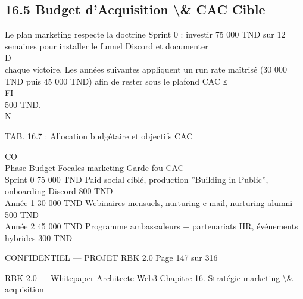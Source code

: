\subsection{16.5 Budget d’Acquisition \textbackslash{}& CAC Cible}
Le plan marketing respecte la doctrine Sprint 0 : investir 75 000 TND sur 12 semaines pour installer le funnel Discord et documenter\\
\vspace{0.5em}
\vspace{0.5em}
\vspace{0.5em}
\vspace{0.5em}
D\\
chaque victoire. Les années suivantes appliquent un run rate maîtrisé (30 000 TND puis 45 000 TND) afin de rester sous le plafond CAC ≤\\
\vspace{0.5em}
\vspace{0.5em}
\vspace{0.5em}
\vspace{0.5em}
FI\\
500 TND.\\
\vspace{0.5em}
N\\
\begin{center}\begin{tabular}TAB. 16.7 : Allocation budgétaire et objectifs CAC\end{tabular}\end{center}
CO\\
Phase Budget        Focales marketing                                                      Garde-fou CAC\\
Sprint 0 75 000 TND Paid social ciblé, production ”Building in Public”, onboarding Discord 800 TND\\
Année 1 30 000 TND Webinaires mensuels, nurturing e-mail, nurturing alumni                 500 TND\\
Année 2 45 000 TND Programme ambassadeurs + partenariats HR, événements hybrides           300 TND\\
\vspace{0.5em}
\vspace{0.5em}
\vspace{0.5em}
\vspace{0.5em}
\begin{confidential}CONFIDENTIEL — PROJET RBK 2.0                                Page 147 sur 316\end{confidential}
RBK 2.0 — Whitepaper Architecte Web3                                                           Chapitre 16. Stratégie marketing \textbackslash{}& acquisition\\

